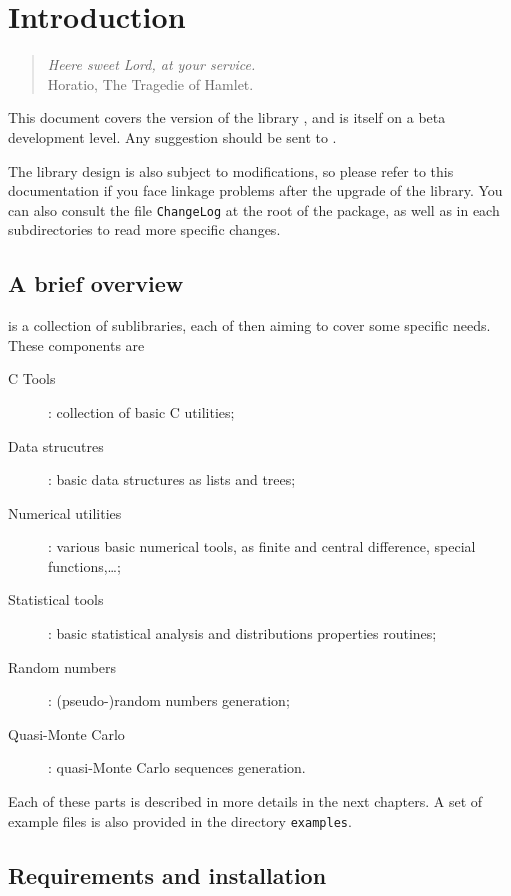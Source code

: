 \chapter{Introduction}

\begin{quote}
\begin{flushright}
{\sl Heere sweet Lord, at your service.}\\
Horatio, The Tragedie of Hamlet.
\end{flushright}
\end{quote}

This document covers the version \version{} of the library \name{},
and is itself on a beta development level.
Any suggestion should be sent to \mail.

The library design is also subject to modifications, so please refer
to this documentation if you face linkage problems after the upgrade
of the library.
You can also consult the file \verb|ChangeLog| at the root of the
package, as well as in each subdirectories to read more specific
changes.

\section{A brief overview}

\name{} is a collection of sublibraries, each of then aiming to cover
some specific needs.
These components are
\begin{description}
\item[C Tools]: collection of basic C utilities;
\item[Data strucutres]: basic data structures as lists and trees;
\item[Numerical utilities]: various basic numerical tools, as finite
  and central difference, special functions,\ldots;
\item[Statistical tools]: basic statistical analysis and distributions
  properties routines;
\item[Random numbers]: (pseudo-)random numbers generation;
\item[Quasi-Monte Carlo]: quasi-Monte Carlo sequences generation.
\end{description}
Each of these parts is described in more details in the next chapters.
A set of example files is also provided in the directory \texttt{examples}.

\section{Requirements and installation}
\label{sec:requirements}

